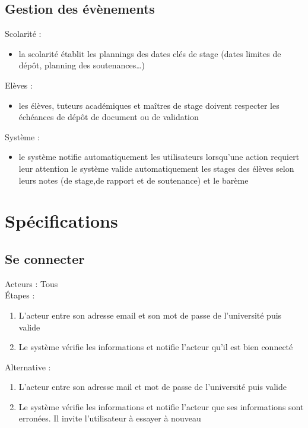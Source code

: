\documentclass{scrreprt}
\begin{document}
\subsection{Gestion des \'ev\`enements}
Scolarit\'e :
\begin{itemize}
\item la scolarit\'e \'etablit les plannings des dates cl\'es de stage (dates limites de d\'ep\^ot, planning des soutenances…)
\end{itemize}

Elèves :
\begin{itemize}
\item les \'el\`eves, tuteurs acad\'emiques et ma\^itres de stage doivent respecter les \'ech\'eances de d\'ep\^ot de document ou de validation
\end{itemize}


Système :
\begin{itemize}
\item le syst\`eme notifie automatiquement les utilisateurs lorsqu’une action requiert leur attention
le syst\`eme valide automatiquement les stages des \'el\`eves selon leurs notes (de stage,de rapport et de soutenance) et le barème
\end{itemize}

\section{Sp\'ecifications}
\subsection{Se connecter}
Acteurs : Tous 
\\
\'Etapes :
\begin{enumerate}
\item L’acteur entre son adresse email et son mot de passe de l’universit\'e puis valide
\item Le syst\`eme v\'erifie les informations et notifie l’acteur qu’il est bien connect\'e
\end{enumerate} 
Alternative : 
\begin{enumerate}
\item L’acteur entre son adresse mail et mot de passe de l’universit\'e puis valide
\item Le syst\`eme v\'erifie les informations et notifie l’acteur que ses informations sont erron\'ees. Il invite l’utilisateur \`a essayer \`a nouveau
\end{enumerate}
\end{document}
